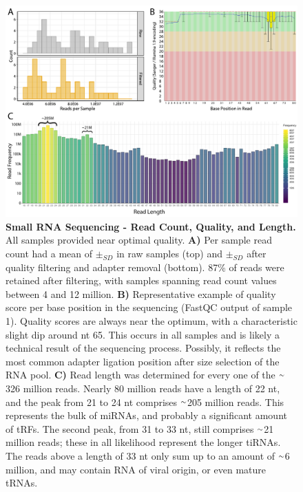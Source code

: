 \begin{figure}[ht]
\centering
\includegraphics[width=\textwidth]{figures/read-quality-length}
\caption[Small RNA Sequencing - Read Count, Quality, and Length.]{\textbf{Small RNA Sequencing - Read Count, Quality, and Length.} All samples provided near optimal quality. \textbf{A)} Per sample read count had a mean of  $\pm_{SD}$  in raw samples (top) and  $\pm_{SD}$  after quality filtering and adapter removal (bottom). 87\% of reads were retained after filtering, with samples spanning read count values between 4 and 12 million. \textbf{B)} Representative example of quality score per base position in the sequencing (FastQC output of sample \num{1}). Quality scores are always near the optimum, with a characteristic slight dip around nt 65. This occurs in all samples and is likely a technical result of the sequencing process. Possibly, it reflects the most common adapter ligation position after size selection of the RNA pool. \textbf{C)} Read length was determined for every one of the $\smallsim$326 million reads. Nearly 80 million reads have a length of 22 nt, and the peak from 21 to 24 nt comprises $\smallsim$205 million reads. This represents the bulk of miRNAs, and probably a significant amount of tRFs. The second peak, from 31 to 33 nt, still comprises $\smallsim$21 million reads; these in all likelihood represent the longer tiRNAs. The reads above a length of 33 nt only sum up to an amount of $\smallsim$6 million, and may contain RNA of viral origin, or even mature tRNAs.
\label{fig:read-quality-length}}
\end{figure}

